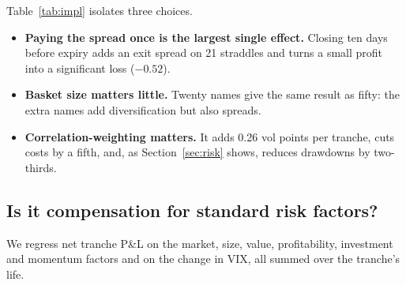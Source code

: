 \begin{table}[t]
  \centering
  \small
  \caption{Implementation choices, full sample, P\&L per tranche (vol points per unit vega).}
  \label{tab:impl}
\end{table}

Table~\ref{tab:impl} isolates three choices.
\begin{itemize}
  \item \textbf{Paying the spread once is the largest single effect.} Closing ten days before expiry adds an exit spread on 21 straddles and turns a small profit into a significant loss ($-0.52$).
  \item \textbf{Basket size matters little.} Twenty names give the same result as fifty: the extra names add diversification but also spreads.
  \item \textbf{Correlation-weighting matters.} It adds 0.26 vol points per tranche, cuts costs by a fifth, and, as Section~\ref{sec:risk} shows, reduces drawdowns by two-thirds.
\end{itemize}

\subsection{Is it compensation for standard risk factors?}

We regress net tranche P\&L on the market, size, value, profitability, investment \citep{FamaFrench2015} and momentum \citep{Carhart1997} factors and on the change in VIX, all summed over the tranche's life.

